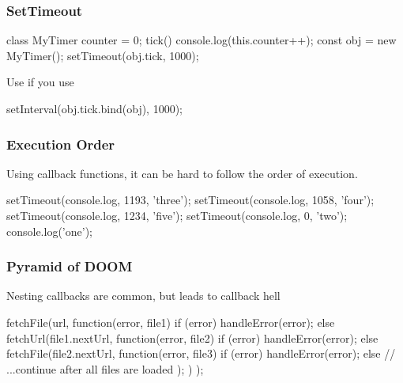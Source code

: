 \begin{frame}[fragile] \frametitle{SetTimeout}
\begin{CodeBox}{}
class MyTimer {
  counter = 0;
  tick() {
    console.log(this.counter++);
  }
}
const obj = new MyTimer();
setTimeout(obj.tick, 1000);
\end{CodeBox}
\vspace{4mm}
Use  if you use 
\vspace{4mm}
\begin{CodeBox}{}
setInterval(obj.tick.bind(obj), 1000);
\end{CodeBox}

\end{frame}

\begin{frame}[fragile] \frametitle{Execution Order}
Using callback functions, it can be hard to follow the order of execution.
\vspace{5mm}
\begin{CodeBox}{}
setTimeout(console.log, 1193, 'three');
setTimeout(console.log, 1058, 'four');
setTimeout(console.log, 1234, 'five');
setTimeout(console.log, 0, 'two');
console.log('one');
\end{CodeBox}
\end{frame}

\begin{frame}[fragile] \frametitle{Pyramid of DOOM}
Nesting callbacks are common, but leads to callback hell
\vspace{5mm}
\begin{CodeBox}{}
fetchFile(url, function(error, file1) {
  if (error) {
    handleError(error);
  } else {
    fetchUrl(file1.nextUrl, function(error, file2) {
      if (error) {
        handleError(error);
      } else {
        fetchFile(file2.nextUrl, function(error, file3) {
          if (error) {
            handleError(error);
          } else {
            // ...continue after all files are loaded
          }
        });
      }
    })
  }
});\end{CodeBox}
\end{frame}

